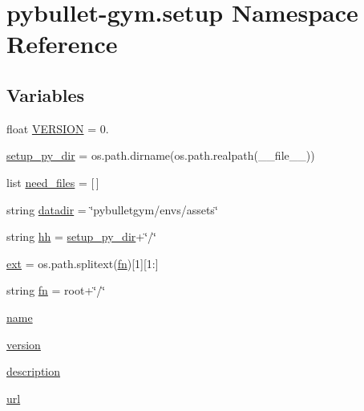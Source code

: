 \hypertarget{namespacepybullet-gym_1_1setup}{}\section{pybullet-\/gym.setup Namespace Reference}
\label{namespacepybullet-gym_1_1setup}
\subsection*{Variables}
\begin{DoxyCompactItemize}
\item 
float \hyperlink{namespacepybullet-gym_1_1setup_aca07b4f29306bcccdabcd823403668ed}{V\+E\+R\+S\+I\+ON} = 0.
\item 
\hyperlink{namespacepybullet-gym_1_1setup_aea2e24ad8e50ce857991531b431dcf87}{setup\+\_\+py\+\_\+dir} = os.\+path.\+dirname(os.\+path.\+realpath(\+\_\+\+\_\+file\+\_\+\+\_\+))
\item 
list \hyperlink{namespacepybullet-gym_1_1setup_afb33ea2198b21a77b6db3e523a4ac72a}{need\+\_\+files} = \mbox{[}$\,$\mbox{]}
\item 
string \hyperlink{namespacepybullet-gym_1_1setup_a3654e7ede0195fc072e944f57af3aa29}{datadir} = \char`\"{}pybulletgym/envs/assets\char`\"{}
\item 
string \hyperlink{namespacepybullet-gym_1_1setup_a0a9bee282bbc69aa0e3ecebffd3653a5}{hh} = \hyperlink{namespacepybullet-gym_1_1setup_aea2e24ad8e50ce857991531b431dcf87}{setup\+\_\+py\+\_\+dir}+\char`\"{}/\char`\"{}
\item 
\hyperlink{namespacepybullet-gym_1_1setup_aeae0f87f04affe37723e80359fa580f0}{ext} = os.\+path.\+splitext(\hyperlink{namespacepybullet-gym_1_1setup_a0c50456b56113b23543800298eff04c1}{fn})\mbox{[}1\mbox{]}\mbox{[}1\+:\mbox{]}
\item 
string \hyperlink{namespacepybullet-gym_1_1setup_a0c50456b56113b23543800298eff04c1}{fn} = root+\char`\"{}/\char`\"{}
\item 
\hyperlink{namespacepybullet-gym_1_1setup_aaf5f8e71b4e68a4c46a0d8ca700d8b5b}{name}
\item 
\hyperlink{namespacepybullet-gym_1_1setup_a8d27b9d24f16174ff7014bd5d60a39d2}{version}
\item 
\hyperlink{namespacepybullet-gym_1_1setup_abb162ef9737fa16dc3806471cbbaa07e}{description}
\item 
\hyperlink{namespacepybullet-gym_1_1setup_a6e778f26d12c9149dedfefb994c5703d}{url}
\item 

\end{DoxyCompactItemize}
